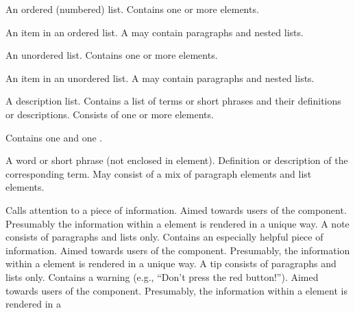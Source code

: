 \documentclass[11pt]{article}
\begin{document}
{\begin{description}
\begin{description}
      An ordered (numbered) list.  Contains one or
    more  elements.
    \begin{description}
        An item in an ordered list.  A
       may contain paragraphs and nested lists.
    \end{description}
     An unordered list.  Contains one or
    more  elements.
    \begin{description}
        An item in an unordered list.  A
       may contain paragraphs and nested lists.
    \end{description}
     A description list.  Contains a list of terms or
    short phrases
    and their definitions or descriptions.  Consists of one or more 
    elements. 
    \begin{description}
       Contains one  and one
      . 
      \begin{description}
         A word or short phrase (not enclosed in
         element).
         Definition or description of the
        corresponding term.  May consist of a mix of paragraph elements and
        list elements.
      \end{description}
    \end{description}
      Calls attention to a piece of information.  Aimed
    towards users of the component.  Presumably the information within a
     element is rendered in a unique
    way.  A note consists of paragraphs and lists only.
     Contains an especially helpful piece of information.
    Aimed towards users of the component.  Presumably, the information
    within a  element is rendered in a unique way.  A
    tip consists of paragraphs and lists only.
     Contains a warning (e.g., ``Don't press the red
    button!''). Aimed towards users of the component.  Presumably, the
    information within a  element is rendered in a

\end{description}
\end{description}}
\end{document}
